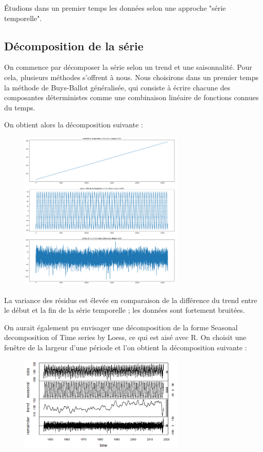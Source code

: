\documentclass[../report.tex]{subfiles}
\begin{document}
\par Étudions dans un premier temps les données selon une approche "série temporelle".

\subsection{Décomposition de la série}

\par On commence par décomposer la série selon un trend et une saisonnalité. Pour cela, plusieurs méthodes s’offrent à nous. Nous choisirons dans un premier temps la méthode de Buys-Ballot généralisée, qui consiste à écrire chacune des composantes déterministes comme une combinaison linéaire de fonctions connues du temps.

\par On obtient alors la décomposition suivante :
\begin{figure}[H]
  \centering
    \includegraphics[width=0.7\textwidth]{images/part_1/buysballot.png}
\end{figure}

\par La variance des résidus est élevée en comparaison de la différence du trend entre le début et la fin de la série temporelle ; les données sont fortement bruitées.

\par On aurait également pu envisager une décomposition de la forme Seasonal decomposition of Time series by Loess, ce qui est aisé avec R. On choisit une fenêtre de la largeur d’une période et l’on obtient la décomposition suivante :
\begin{figure}[H]
  \centering
    \includegraphics[width=0.7\textwidth]{images/part_1/slt.png}
\end{figure}
\end{document}
